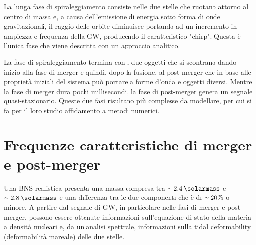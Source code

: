 La lunga fase di spiraleggiamento consiste nelle due stelle che ruotano attorno al centro di massa e, a causa dell'emissione di energia sotto forma di onde gravitazionali, il raggio delle orbite diminuisce portando ad un incremento in ampiezza e frequenza della GW, producendo il caratteristico "chirp". Questa è l'unica fase che viene descritta con un approccio analitico.

La fase di spiraleggiamento termina con i due oggetti che si scontrano dando inizio alla fase di merger e quindi, dopo la fusione, al post-merger che in base alle proprietà iniziali del sistema può portare a forme d'onda e oggetti diversi.	Mentre la fase di merger dura pochi millisecondi, la fase di post-merger genera un segnale quasi-stazionario. Queste due fasi risultano più complesse da modellare, per cui si fa per il loro studio affidamento a metodi numerici. \cite{maggiore2008gravitational}

\section[Frequenze caratteristiche]{Frequenze caratteristiche di merger e post-merger}
\label{section:frequenze_caratteristiche}
Una BNS realistica presenta una massa compresa tra $\smallsim\SI{2.4}{\solarmass}$ e $\smallsim\SI{2.8}{\solarmass}$ e una differenza tra le due componenti che è di $\smallsim20\%$ o minore. 
A partire dal segnale di GW, in particolare nelle fasi di merger e post-merger, possono essere ottenute informazioni sull'equazione di stato della materia a densità nucleari e, da un'analisi spettrale, informazioni sulla tidal deformability (deformabilità mareale) delle due stelle.

